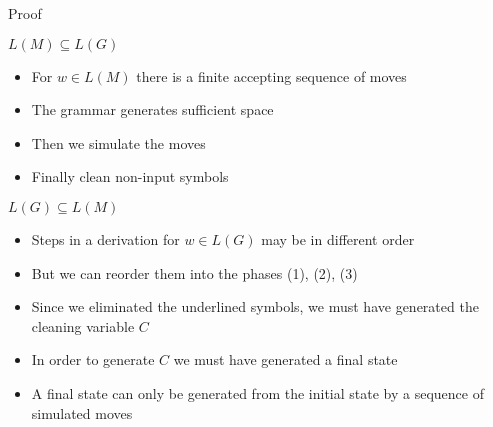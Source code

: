 \documentclass[handout]{beamer}
\begin{document}
\begin{frame}{Proof}

    \alert{$L(M)\subseteq L(G)$}

    \begin{itemize}
        \item For $w\in L(M)$ there is a finite accepting sequence of moves
        \item The grammar generates sufficient space
        \item Then we simulate the moves
        \item Finally clean non-input symbols
    \end{itemize}

    \alert{$L(G)\subseteq L(M)$}
    
    \begin{itemize}
        \item Steps in a derivation for $w\in L(G)$ may be in different order
        \item But we can reorder them into the phases (1), (2), (3)
        \item Since we eliminated the underlined symbols, we must have generated the cleaning variable $C$
        \item In order to generate $C$ we must have generated a final state
        \item A final state can only be generated from the initial state by a sequence of simulated moves       
        \hfill\qedsymbol
    \end{itemize}

\end{frame}
\end{document}
